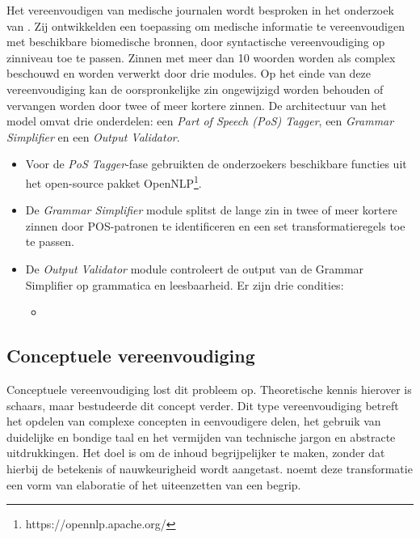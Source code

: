 Het vereenvoudigen van medische journalen wordt besproken in het onderzoek van \textcite{Kandula2010}. Zij ontwikkelden een toepassing om medische informatie te vereenvoudigen met beschikbare biomedische bronnen, door syntactische vereenvoudiging op zinniveau toe te passen. Zinnen met meer dan 10 woorden worden als complex beschouwd en worden verwerkt door drie modules. Op het einde van deze vereenvoudiging kan de oorspronkelijke zin ongewijzigd worden behouden of vervangen worden door twee of meer kortere zinnen. De architectuur van het model omvat drie onderdelen: een \textit{Part of Speech (PoS) Tagger}, een \textit{Grammar Simplifier} en een \textit{Output Validator}.

\begin{itemize}
	\item Voor de \textit{PoS Tagger}-fase gebruikten de onderzoekers beschikbare functies uit het open-source pakket OpenNLP\footnote{https://opennlp.apache.org/}.
	\item De \textit{Grammar Simplifier} module splitst de lange zin in twee of meer kortere zinnen door POS-patronen te identificeren en een set transformatieregels toe te passen.
	\item De \textit{Output Validator} module controleert de output van de Grammar Simplifier op grammatica en leesbaarheid. Er zijn drie condities:
	\begin{itemize}
		\item 
	\end{itemize}
\end{itemize}  


\subsection{Conceptuele vereenvoudiging}

Conceptuele vereenvoudiging lost dit probleem op. Theoretische kennis hierover is schaars, maar \textcite{Siddharthan2006} bestudeerde dit concept verder. Dit type vereenvoudiging betreft het opdelen van complexe concepten in eenvoudigere delen, het gebruik van duidelijke en bondige taal en het vermijden van technische jargon en abstracte uitdrukkingen. Het doel is om de inhoud begrijpelijker te maken, zonder dat hierbij de betekenis of nauwkeurigheid wordt aangetast. \textcite{Siddharthan2006} noemt deze transformatie een vorm van elaboratie of het uiteenzetten van een begrip.


